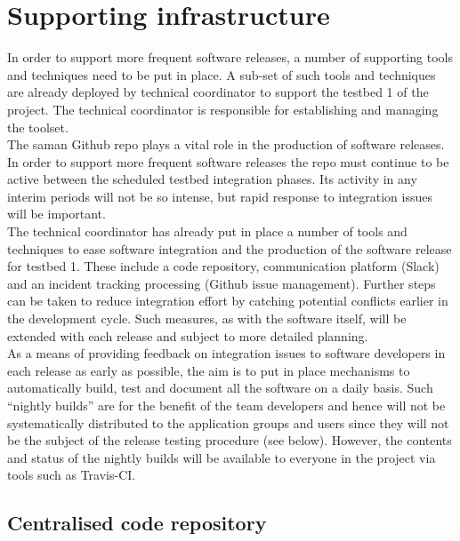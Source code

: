 \section{Supporting infrastructure}

\noindent In order to support more frequent software releases, a number of supporting tools and techniques need to be put in place. A sub-set of such tools and techniques are already deployed by technical coordinator to support the testbed 1 of the project. The technical coordinator is responsible for establishing and managing the toolset.\\

\noindent The saman Github repo plays a vital role in the production of software releases. In order to support more frequent software releases the repo must continue to be active between the scheduled testbed integration phases. Its activity in any interim periods will not be so intense, but rapid response to integration issues will be important.\\

\noindent The technical coordinator has already put in place a number of tools and techniques to ease software integration and the production of the software release for testbed 1. These include a code repository, communication platform (Slack) and an incident tracking processing (Github issue management). Further steps can be taken to reduce integration effort by catching potential conflicts earlier in the development cycle. Such measures, as with the software itself, will be extended with each release and subject to more detailed planning.\\

\noindent As a means of providing feedback on integration issues to software developers in each release as early as possible, the aim is to put in place mechanisms to automatically build, test and document all the software on a daily basis. Such “nightly builds” are for the benefit of the team developers and hence will not be systematically distributed to the application groups and users since they will not be the subject of the release testing procedure (see below). However, the contents and status of the nightly builds will be available to everyone in the project via tools such as Travis-CI.

\subsection{Centralised code repository}

